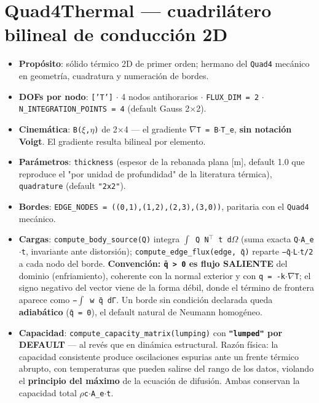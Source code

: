 \documentclass[11pt,letterpaper,oneside]{report}
\begin{document}
\section{Quad4Thermal --- cuadrilátero bilineal de conducción 2D}

\begin{itemize}
  \item \textbf{Propósito}: sólido térmico 2D de primer orden; hermano del \texttt{Quad4} mecánico en geometría, cuadratura y numeración de bordes.
  \item \textbf{DOFs por nodo}: \texttt{['T']} \ensuremath{\cdot} 4 nodos antihorarios \ensuremath{\cdot} \texttt{FLUX\_DIM = 2} \ensuremath{\cdot} \texttt{N\_INTEGRATION\_POINTS = 4} (default Gauss 2\ensuremath{\times}2).
  \item \textbf{Cinemática}: \texttt{B(\ensuremath{\xi},\ensuremath{\eta})} de 2\ensuremath{\times}4 --- el gradiente \texttt{\ensuremath{\nabla}T = B\ensuremath{\cdot}T\_e}, \textbf{sin notación Voigt}. El gradiente resulta bilineal por elemento.
  \item \textbf{Parámetros}: \texttt{thickness} (espesor de la rebanada plana [m], default 1.0 que reproduce el "por unidad de profundidad" de la literatura térmica), \texttt{quadrature} (default \texttt{"2x2"}).
  \item \textbf{Bordes}: \texttt{EDGE\_NODES = ((0,1),(1,2),(2,3),(3,0))}, paritaria con el \texttt{Quad4} mecánico.
  \item \textbf{Cargas}: \texttt{compute\_body\_source(Q)} integra \texttt{\ensuremath{\int} Q N\ensuremath{^{\top}} t d\ensuremath{\Omega}} (suma exacta \texttt{Q\ensuremath{\cdot}A\_e\ensuremath{\cdot}t}, invariante ante distorsión); \texttt{compute\_edge\_flux(edge, q̄)} reparte \texttt{−q̄\ensuremath{\cdot}L\ensuremath{\cdot}t/2} a cada nodo del borde. \textbf{Convención: \texttt{q̄ > 0} es flujo SALIENTE} del dominio (enfriamiento), coherente con la normal exterior y con \texttt{q = -k\ensuremath{\cdot}\ensuremath{\nabla}T}; el signo negativo del vector viene de la forma débil, donde el término de frontera aparece como \texttt{−\ensuremath{\int} w q̄ dΓ}. Un borde sin condición declarada queda \textbf{adiabático} (\texttt{q̄ = 0}), el default natural de Neumann homogéneo.
  \item \textbf{Capacidad}: \texttt{compute\_capacity\_matrix(lumping)} con \textbf{\texttt{"lumped"} por DEFAULT} --- al revés que en dinámica estructural. Razón física: la capacidad consistente produce oscilaciones espurias ante un frente térmico abrupto, con temperaturas que pueden salirse del rango de los datos, violando el \textbf{principio del máximo} de la ecuación de difusión. Ambas conservan la capacidad total \texttt{\ensuremath{\rho}c\ensuremath{\cdot}A\_e\ensuremath{\cdot}t}.

\end{itemize}
\end{document}

